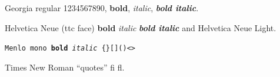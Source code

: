 \documentclass{article}
\begin{document}
Georgia regular 1234567890, \textbf{bold}, \textit{italic}, \textbf{\textit{bold italic}}.

\textsf{Helvetica Neue (ttc face) \textbf{bold} \textit{italic} \textbf{\textit{bold italic}}}
and {\hnlight Helvetica Neue Light}.

\texttt{Menlo mono \textbf{bold} \textit{italic} \{\}[]()<>}

{\tnr Times New Roman ``quotes'' fi fl.}
\end{document}
